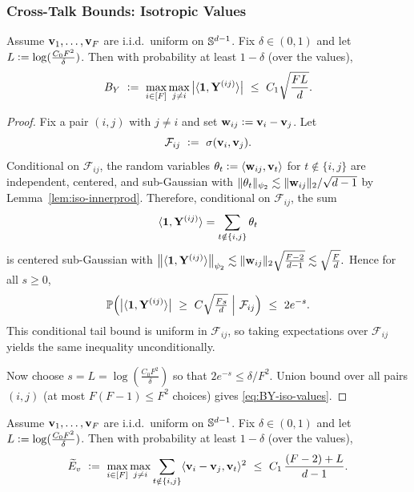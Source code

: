 \subsubsection{Cross-Talk Bounds: Isotropic Values}

\begin{lemma}
\label{lem:BY-iso-values}
Assume ${\mathbf{v}}_{1},\dots,{\mathbf{v}}_{F}$ are i.i.d.\ uniform on $\mathbb{S}^{d-1}$.
Fix $\delta\in(0,1)$ and let $L\vcentcolon= \log(\tfrac{C_{0} F^2}{\delta})$.
Then with probability at least $1-\delta$ (over the values),
\begin{equation}
B_{Y}\ \defeq\ \max_{i\in[F]}\max_{j\neq i}\big|\ip{\vone}{\vY^{(ij)}}\big|
\ \le\ C_{1}\sqrt{\frac{FL}{d}}.
\label{eq:BY-iso-values}
\end{equation}
\end{lemma}

\begin{proof}
Fix a pair $(i,j)$ with $j\neq i$ and set ${\mathbf{w}}_{ij}\vcentcolon= {\mathbf{v}}_{i}-{\mathbf{v}}_{j}$.
Let
\[
\mathcal{F}_{ij}\ \defeq\ \sigma(\vv_{i},\vv_{j}).
\]
Conditional on $\mathcal{F}_{ij}$, the random variables
\(
\theta_{t}\vcentcolon= \langle {{\mathbf{w}}_{ij}}, {{\mathbf{v}}_t} \rangle
\)
for $t\notin\{i,j\}$ are independent, centered, and sub-Gaussian with
$\|\theta_{t}\|_{\psi_2}\lesssim \|{\mathbf{w}}_{ij}\|_{2}/\sqrt{d-1}$ by Lemma~\ref{lem:iso-innerprod}.
Therefore, conditional on $\mathcal{F}_{ij}$, the sum
\[
\langle {{\mathbf{1}}}, {\mathbf{Y}^{(ij)}} \rangle=\sum_{t\notin\{i,j\}}\theta_{t}
\]
is centered sub-Gaussian with
\(
\big\|\langle {{\mathbf{1}}}, {\mathbf{Y}^{(ij)}} \rangle\big\|_{\psi_2}\lesssim \|{\mathbf{w}}_{ij}\|_{2}\sqrt{\tfrac{F-2}{d-1}}
\lesssim \sqrt{\tfrac{F}{d}}.
\)
Hence for all $s\ge 0$,
\[
\mathbb{P}\Big(
\big|\langle {{\mathbf{1}}}, {\mathbf{Y}^{(ij)}} \rangle\big|\ \ge\ C\sqrt{\tfrac{Fs}{d}}
\ \Big|\ \mathcal{F}_{ij}
\Big)
\ \le\ 2e^{-s}.
\]
This conditional tail bound is uniform in $\mathcal{F}_{ij}$, so taking expectations over $\mathcal{F}_{ij}$
yields the same inequality unconditionally.

Now choose $s= L=\log(\tfrac{C_{0} F^2}{\delta})$ so that
$2e^{-s}\le \delta/F^2$.
Union bound over all pairs $(i,j)$ (at most $F(F-1)\le F^2$ choices) gives \eqref{eq:BY-iso-values}.
\end{proof}


\begin{lemma}
\label{lem:Ev-iso-values}
Assume ${\mathbf{v}}_{1},\dots,{\mathbf{v}}_{F}$ are i.i.d.\ uniform on $\mathbb{S}^{d-1}$.
Fix $\delta\in(0,1)$ and let $L\vcentcolon= \log(\tfrac{C_{0} F^2}{\delta})$.
Then with probability at least $1-\delta$ (over the values),
\begin{equation}
\widetilde{E}_{v}\ \defeq\ \max_{i\in[F]}\max_{j\neq i}\sum_{t\notin\{i,j\}}\ip{\vv_{i}-\vv_j}{\vv_t}^2
\ \le\ C_{1}\,\frac{(F-2)+L}{d-1}.
\label{eq:Ev-iso-values}
\end{equation}
\end{lemma}

